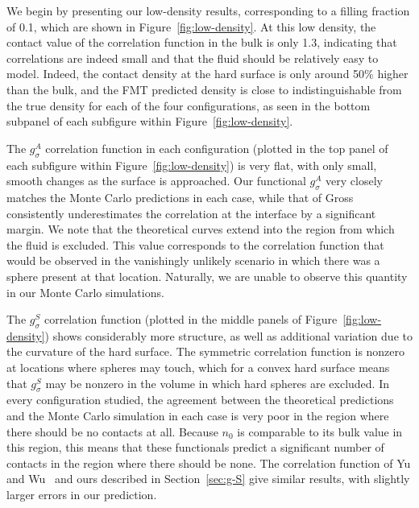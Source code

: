 We begin by presenting our low-density results, corresponding to a
filling fraction of 0.1, which are shown in
Figure~\ref{fig:low-density}.  At this low density,
the contact value of the correlation function in the bulk is only 1.3,
indicating that correlations are indeed small and that the fluid should be
relatively easy to model.  Indeed, the contact density at the hard
surface is only around 50\% higher than the bulk, and the FMT
predicted density is close to indistinguishable from the true
density for each of the four configurations, as seen in the bottom
subpanel of each subfigure within Figure~\ref{fig:low-density}.

The $g_\sigma^A$ correlation function in each configuration (plotted
in the top panel of each subfigure within Figure~\ref{fig:low-density}) is
very flat, with only small, smooth changes as the surface is approached.
Our functional $g_\sigma^A$ very closely matches the Monte Carlo
predictions in each case, while that of Gross consistently
underestimates the correlation at the interface by a significant margin.  We note that the theoretical curves
extend into the region from which the fluid is excluded.  This value
corresponds to the correlation function that would be observed in the
vanishingly unlikely scenario in which there was a sphere present at
that location.  Naturally, we are unable to observe this quantity in
our Monte Carlo simulations.

The $g_\sigma^S$ correlation function (plotted
in the middle panels of Figure~\ref{fig:low-density}) shows considerably more
structure, as well as additional variation due to the curvature of the
hard surface.  The symmetric correlation function is nonzero at
locations where spheres may touch, which for a convex hard surface
means that $g_\sigma^S$ may be nonzero in the volume in which hard
spheres are excluded.  In every configuration studied, the agreement
between the theoretical predictions and the Monte Carlo simulation in
each case is very poor in the region where there should be no contacts
at all.  Because $n_0$ is comparable to its bulk value in this region,
this means that these functionals predict a significant number of
contacts in the region where there should be none.  The correlation
function of Yu and Wu~\cite{yu2002fmt-dft-inhomogeneous-associating}
and ours described in Section~\ref{sec:g-S} give similar results, with
slightly larger errors in our prediction.

